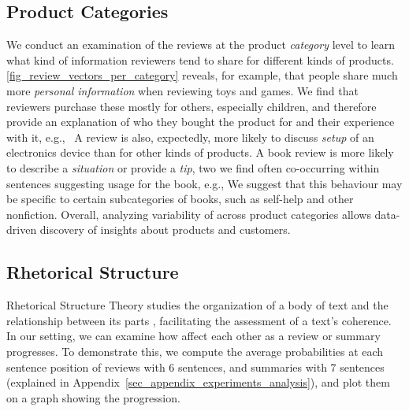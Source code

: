 

\subsection{Product Categories}
We conduct an examination of the reviews at the product \textit{category} level to learn what kind of information reviewers tend to share for different kinds of products.
\autoref{fig_review_vectors_per_category} reveals, for example, that people share much more \textit{personal information} when reviewing toys and games. 
We find that reviewers purchase these mostly for others, especially children, and therefore provide an explanation of who they bought the product for and their experience with it, e.g.,~ 
A review is also, expectedly, more likely to discuss \textit{setup} of an electronics device than for other kinds of products. 
A book review is more likely to describe a \textit{situation} or provide a \textit{tip},
two \taxtypes{} we find often co-occurring within sentences suggesting usage for the book, e.g.,
We suggest that this behaviour may be specific to certain subcategories of books, such as self-help and other nonfiction. 
Overall, analyzing variability of \taxtypes{} across product categories allows data-driven discovery of insights about products and customers.


\subsection{Rhetorical Structure}
\label{sec_analysis_rhetorical}

Rhetorical Structure Theory studies the organization of a body of text and the relationship between its parts \citep{mann1988rst}, facilitating the assessment of a text's coherence. 
In our setting, we can examine how \taxtypes{} affect each other as a review or summary progresses. 
To demonstrate this, we compute the average \taxtype{} probabilities at each sentence position of reviews with 6 sentences, and summaries with 7 sentences (explained in Appendix~\ref{sec_appendix_experiments_analysis}), and plot them on a graph showing the progression.


